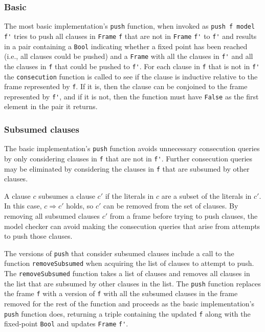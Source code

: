 \documentclass[12pt,a4paper,twoside,openright]{report}
\begin{document}
{\subsubsection{Basic}
The most basic implementation's \verb,push, function, when invoked as \verb,push f model f', tries
to push all clauses in \verb,Frame, \verb,f, that are not in \verb,Frame, \verb,f', to \verb,f', and
results in a pair containing a \verb,Bool, indicating whether a fixed point has been reached
(i.e., all clauses could be pushed) and a \verb,Frame, with all the clauses in \verb,f', and all
the clauses in \verb,f, that could be pushed to \verb,f',.
For each clause in \verb,f, that is not in \verb,f', the \verb,consecution, function is called to
see if the clause is inductive relative to the frame represented by \verb,f,. If it is, then
the clause can be conjoined to the frame represented by \verb,f',, and if it is not, then the
function must have \verb,False, as the first element in the pair it returns.

\subsubsection{Subsumed clauses}
The basic implementation's \verb,push, function avoids unnecessary consecution queries by only
considering clauses in \verb,f, that are not in \verb,f',. Further consecution queries may be
eliminated by considering the clauses in \verb,f, that are subsumed by other clauses.

A clause $c$ subsumes a clause $c'$ if the literals in $c$ are a subset of the literals in $c'$.
In this case, $c \Rightarrow c'$ holds, so $c'$ can be removed from the set of clauses. By
removing all subsumed clauses $c'$ from a frame before trying to push clauses, the model
checker can avoid making the consecution queries that arise from attempts to push those clauses.

The versions of \verb,push, that consider subsumed clauses include a call to the function
\verb,removeSubsumed, when acquiring the list of clauses to attempt to push.
The \verb,removeSubsumed, function takes a list of clauses and removes all clauses in the list
that are subsumed by other clauses in the list. The \verb,push, function replaces the frame
\verb,f, with a version of \verb,f, with all the subsumed clauses in the frame removed for
the rest of the function and proceeds as the basic implementation's \verb,push, function does,
returning a triple containing the updated \verb,f, along with the fixed-point \verb,Bool,
and updates \verb,Frame, \verb,f',.

}
\end{document}
